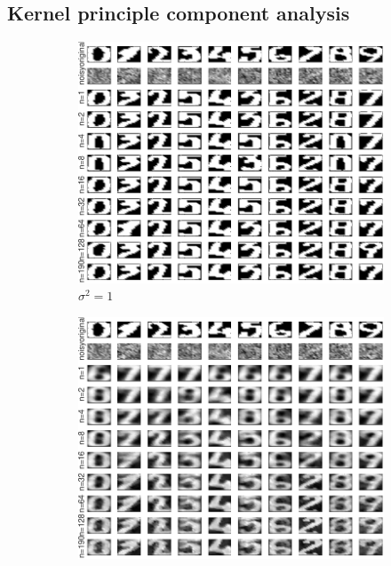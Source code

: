 \documentclass{article}
\begin{document}
    \subsection{Kernel principle component analysis}
        \begin{figure}[h]
             \centering
             \begin{subfigure}[b]{0.3\textwidth}
                 \centering
                 \includegraphics[width=\textwidth]{Assignment 3/figures/2_1/KPCA_sigmafactor_1.00.pdf}
                 \caption{$\sigma^2 = 1$}
                 \label{fig:kpca_digits_1}
             \end{subfigure}
            \hfill
             \begin{subfigure}[b]{0.3\textwidth}
                 \centering
                 \includegraphics[width=\textwidth]{Assignment 3/figures/2_1/KPCA_sigmafactor_10.00.pdf}

\end{subfigure}
\end{figure}
\end{document}
